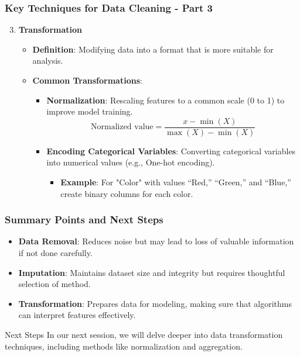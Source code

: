 \documentclass[aspectratio=169]{beamer}
\begin{document}
\begin{frame}[fragile]
    \frametitle{Key Techniques for Data Cleaning - Part 3}
    \begin{enumerate}
        \setcounter{enumi}{2}
        \item \textbf{Transformation}
        \begin{itemize}
            \item \textbf{Definition}: Modifying data into a format that is more suitable for analysis.
            \item \textbf{Common Transformations}:
            \begin{itemize}
                \item \textbf{Normalization}: Rescaling features to a common scale (0 to 1) to improve model training.
                \begin{equation}
                    \text{Normalized value} = \frac{x - \min(X)}{\max(X) - \min(X)}
                \end{equation}
                \item \textbf{Encoding Categorical Variables}: Converting categorical variables into numerical values (e.g., One-hot encoding).
                \begin{itemize}
                    \item \textbf{Example}: For "Color" with values “Red,” “Green,” and “Blue,” create binary columns for each color.
                \end{itemize}
            \end{itemize}
        \end{itemize}
    \end{enumerate}
\end{frame}

\begin{frame}[fragile]
    \frametitle{Summary Points and Next Steps}
    \begin{itemize}
        \item \textbf{Data Removal}: Reduces noise but may lead to loss of valuable information if not done carefully.
        \item \textbf{Imputation}: Maintains dataset size and integrity but requires thoughtful selection of method.
        \item \textbf{Transformation}: Prepares data for modeling, making sure that algorithms can interpret features effectively.
    \end{itemize}
    
    \begin{block}{Next Steps}
        In our next session, we will delve deeper into data transformation techniques, including methods like normalization and aggregation.
    \end{block}
\end{frame}
\end{document}
